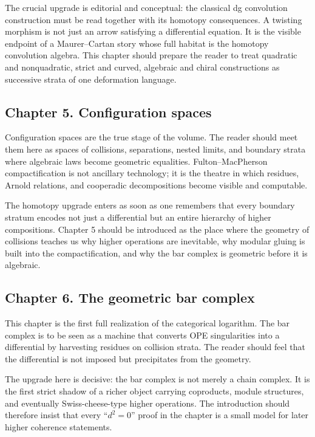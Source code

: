 The crucial upgrade is editorial and conceptual: the classical dg convolution construction must be read together with its homotopy consequences.  A twisting morphism is not just an arrow satisfying a differential equation.  It is the visible endpoint of a Maurer--Cartan story whose full habitat is the homotopy convolution algebra.  This chapter should prepare the reader to treat quadratic and nonquadratic, strict and curved, algebraic and chiral constructions as successive strata of one deformation language.

\subsection*{Chapter 5. Configuration spaces}
Configuration spaces are the true stage of the volume.  The reader should meet them here as spaces of collisions, separations, nested limits, and boundary strata where algebraic laws become geometric equalities.  Fulton--MacPherson compactification is not ancillary technology; it is the theatre in which residues, Arnold relations, and cooperadic decompositions become visible and computable.

The homotopy upgrade enters as soon as one remembers that every boundary stratum encodes not just a differential but an entire hierarchy of higher compositions.  Chapter 5 should be introduced as the place where the geometry of collisions teaches us why higher operations are inevitable, why modular gluing is built into the compactification, and why the bar complex is geometric before it is algebraic.

\subsection*{Chapter 6. The geometric bar complex}
This chapter is the first full realization of the categorical logarithm.  The bar complex is to be seen as a machine that converts OPE singularities into a differential by harvesting residues on collision strata.  The reader should feel that the differential is not imposed but precipitates from the geometry.

The upgrade here is decisive: the bar complex is not merely a chain complex.  It is the first strict shadow of a richer object carrying coproducts, module structures, and eventually Swiss-cheese-type higher operations.  The introduction should therefore insist that every ``$d^2=0$'' proof in the chapter is a small model for later higher coherence statements.

